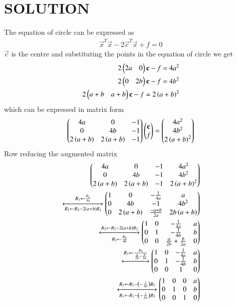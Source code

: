 \documentclass[journal,12pt,twocolumn]{IEEEtran}
\begin{document}
\section{SOLUTION}
The equation of circle can be expressed as
\begin{align}
    \vec{x}^T\vec{x}-2\vec{c}^T\vec{x}+f = 0
\end{align}
$\vec{c}$ is the centre  and substituting the points in the equation of circle we get
\begin{align}
2\begin{pmatrix}2a&0\end{pmatrix}\mathbf{c}-f=4a^2\\
2\begin{pmatrix}0&2b\end{pmatrix}\mathbf{c}-f=4b^2\\
2\begin{pmatrix}a+b&a+b\end{pmatrix}\mathbf{c}-f=2\left(a+b\right)^2
\end{align}
which can be expressed in matrix form
\begin{align}
\begin{pmatrix}4a&0&-1\\0&4b&-1\\2\left(a+b\right)&2\left(a+b\right)&-1\end{pmatrix}\begin{pmatrix}\mathbf{c}\\f\end{pmatrix} = \begin{pmatrix}4a^2\\4b^2\\2\left(a+b\right)^2\end{pmatrix}
\end{align}
Row reducing the augmented matrix
\begin{align}
\begin{pmatrix}4a&0&-1&4a^2\\0&4b&-1&4b^2\\2\left(a+b\right)&2\left(a+b\right)&-1&2\left(a+b\right)^2\end{pmatrix}\\
\xleftrightarrow[R_3\leftarrow R_3-2\left(a+b\right)R_1]{R_1\leftarrow \frac{R_1}{4 a}}
\begin{pmatrix}1 & 0 & - \frac{1}{4 a} & a \\ 0 & 4 b & -1 & 4 b^{2} \\ 0 & 2 \left(a + b\right)& \frac{-a + b}{2 a} & 2b\left(a + b\right)\end{pmatrix}\\
\xleftrightarrow[R_2\leftarrow \frac{R_2}{4 b}]{R_3\leftarrow R_3-2\ensuremath{\left(a + b\right)}R_2}
\begin{pmatrix}1 & 0 & - \frac{1}{4 a} & a \\ 0 & 1 & - \frac{1}{4 b} & b \\ 0 & 0 & \frac{a}{2 b} + \frac{b}{2 a} & 0\end{pmatrix}\\
\xleftrightarrow[]{R_3\leftarrow \frac{R_3}{\frac{a}{2b} + \frac{b}{2a}}}
\begin{pmatrix}1 & 0 & - \frac{1}{4 a} & a \\ 0 & 1 & - \frac{1}{4 b} & b \\ 0 & 0 & 1 & 0\end{pmatrix}\\
\xleftrightarrow[R_1\leftarrow R_1-\left(-\frac{1}{4 a}\right)R_3]{R_2\leftarrow R_2-\ensuremath{\left(-\frac{1}{4 b}\right)}R_3}
\begin{pmatrix}1 & 0 & 0 & a \\ 0 & 1 & 0 & b \\ 0 & 0 & 1 & 0\end{pmatrix}
\end{align}
\end{document}
